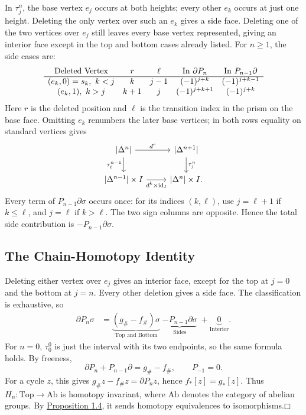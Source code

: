 \documentclass[11pt]{article}
\newcommand{\facehead}[1]{\par\Needspace{4\baselineskip}\subsection{#1}}
\begin{document}
In $\tau_j^n$, the base vertex $e_j$ occurs at both heights; every other $e_k$ occurs at just one height. Deleting the only vertex over such an $e_k$ gives a side face. Deleting one of the two vertices over $e_j$ still leaves every base vertex represented, giving an interior face except in the top and bottom cases already listed. For $n\ge1$, the side cases are:
\[
\begin{array}{c c c c c}
\text{Deleted Vertex}&r&\ell&\text{In }\partial P_n&\text{In }P_{n-1}\partial\\\hline
(e_k,0)=s_k,\ k<j&k&j-1&(-1)^{j+k}&(-1)^{j+k-1}\\
(e_k,1),\ k>j&k+1&j&(-1)^{j+k+1}&(-1)^{j+k}
\end{array}
\]
Here $r$ is the deleted position and $\ell$ is the transition index in the prism on the base face. Omitting $e_k$ renumbers the later base vertices; in both rows equality on standard vertices gives
\begin{equation*}\label{diag:sides}
\begin{tikzcd}
\lvert\Delta^n\rvert\arrow[r,"d^r"]\arrow[d,"\tau_\ell^{n-1}"']&
\lvert\Delta^{n+1}\rvert\arrow[d,"\tau_j^n"]\\
\lvert\Delta^{n-1}\rvert\times I\arrow[r,"d^k\times\mathrm{id}_I"']&
\lvert\Delta^n\rvert\times I.
\end{tikzcd}
\end{equation*}
Every term of $P_{n-1}\partial\sigma$ occurs once: for its indices $(k,\ell)$, use $j=\ell+1$ if $k\le\ell$, and $j=\ell$ if $k>\ell$. The two sign columns are opposite. Hence the total side contribution is $-P_{n-1}\partial\sigma$.

\facehead{The Chain-Homotopy Identity}
Deleting either vertex over $e_j$ gives an interior face, except for the top at $j=0$ and the bottom at $j=n$. Every other deletion gives a side face. The classification is exhaustive, so
\[
\begin{aligned}
\partial P_n\sigma
&=\underbrace{(g_\#-f_\#)\sigma}_{\text{Top and Bottom}}
\;\underbrace{-P_{n-1}\partial\sigma}_{\text{Sides}}
\;+\underbrace{0}_{\text{Interior}}.
\end{aligned}
\]
For $n=0$, $\tau_0^0$ is just the interval with its two endpoints, so the same formula holds. By freeness,
\begin{equation}\label{eq:chain-homotopy}
\partial P_n+P_{n-1}\partial=g_\#-f_\#,\qquad P_{-1}=0.\tag{1}
\end{equation}
For a cycle $z$, this gives $g_\#z-f_\#z=\partial P_nz$, hence $f_*[z]=g_*[z]$. Thus $H_n:\mathrm{Top}\to\mathrm{Ab}$ is homotopy invariant, where $\mathrm{Ab}$ denotes the category of abelian groups. By \hyperlink{prop:homotopy-invariant}{Proposition 1.4}, it sends homotopy equivalences to isomorphisms.\hfill$\mdlgwhtsquare$
\end{document}
